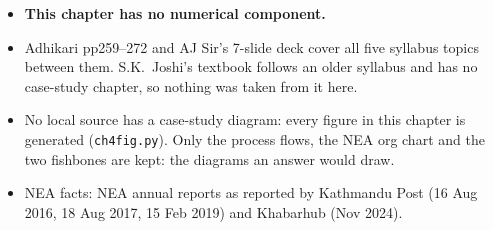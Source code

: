 \begin{itemize}
  \item \textbf{This chapter has no numerical component.}
\end{itemize}

\begin{itemize}
  \item Adhikari pp259--272 and AJ Sir's 7-slide deck cover all five syllabus topics
    between them. S.K.\ Joshi's textbook follows an older syllabus and has no case-study
    chapter, so nothing was taken from it here.
  \item No local source has a case-study diagram: every figure in this chapter is generated
    (\texttt{ch4fig.py}). Only the process flows, the NEA org chart and the two fishbones
    are kept: the diagrams an answer would draw.
  \item NEA facts: NEA annual reports as reported by Kathmandu Post (16 Aug 2016, 18 Aug 2017,
    15 Feb 2019) and Khabarhub (Nov 2024).
\end{itemize}
